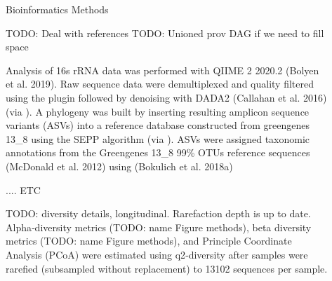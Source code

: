 \documentclass[final]{beamer}
\newlength{\sepwidth}
\newlength{\colwidth}
\newcommand{\separatorcolumn}{\begin{column}{\sepwidth}\end{column}}
\begin{document}
\begin{frame}[t]
\begin{columns}[t]
\begin{column}{\colwidth}
  \begin{block}{Bioinformatics Methods}

    TODO: Deal with references
    TODO: Unioned prov DAG if we need to fill space

    Analysis of 16s rRNA data was performed with QIIME 2 2020.2
    (Bolyen et al. 2019). Raw sequence data were demultiplexed and quality
    filtered using the  plugin followed by denoising with
    DADA2 (Callahan et al. 2016) (via ). A phylogeny was built
    by inserting resulting amplicon sequence variants (ASVs) into a reference
    database constructed from greengenes 13\_8 using the SEPP algorithm (via
   ). ASVs were assigned taxonomic annotations from
   the Greengenes 13\_8 99\% OTUs reference sequences (McDonald et al. 2012)
   using  (Bokulich et al.
   2018a)

    .... ETC
    
    TODO: diversity details, longitudinal. Rarefaction depth is up to date.
    Alpha‐diversity metrics (TODO: name Figure methods), beta diversity
    metrics (TODO: name Figure methods), and Principle Coordinate Analysis
    (PCoA) were estimated using q2‐diversity after samples were rarefied
    (subsampled without replacement) to 13102 sequences per sample.

  \end{block}

\end{column}

\separatorcolumn

\begin{column}{\colwidth}


\end{column}
\end{columns}
\end{frame}
\end{document}
